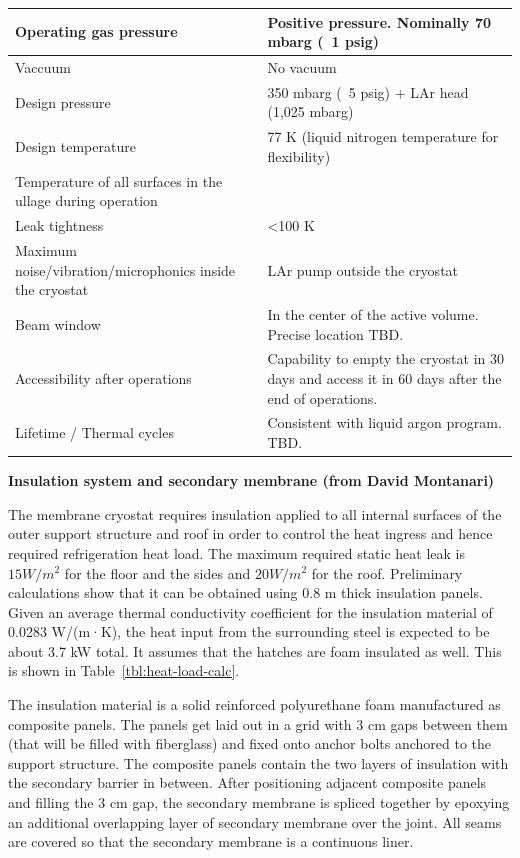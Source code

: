 \begin{table}[htpb]
\begin{tabular}{|p{}|p{}|}
Operating gas pressure   &  Positive pressure. Nominally 70 mbarg (~1 psig) \\ \hline
 Vaccuum  &  No vacuum \\ \hline
 Design pressure  &  350 mbarg (~5 psig) + LAr head (1,025 mbarg) \\ \hline
Design temperature   &  77 K (liquid nitrogen temperature for flexibility) \\ \hline
Temperature of all surfaces in the ullage during operation   &   \\ \hline
Leak tightness   & \textless 100 K  \\ \hline
Maximum noise/vibration/microphonics inside the cryostat   & LAr pump outside the cryostat  \\ \hline
Beam window   & In the center of the active volume. 
Precise location TBD.   \\ \hline
 Accessibility after operations  & Capability to empty the cryostat in 30 days and access it in 60 days after the end of operations. \\ \hline
  Lifetime / Thermal cycles &  Consistent with liquid argon program. TBD. \\ \hline
 \end{tabular}
\end{table}

\textbf{Insulation system and secondary membrane (from David Montanari)}

The membrane cryostat requires insulation applied to all internal surfaces of the outer support structure 
and roof in order to control the heat ingress and hence required refrigeration heat load. The maximum 
required static heat leak is $15 W/m^2$ for the floor and the sides and $20 W/m^2$ for the roof. 
Preliminary calculations show that it can be obtained using 0.8 m thick insulation panels. Given an 
average thermal conductivity coefficient for the insulation material of 0.0283 W/(m·K), the heat input 
from the surrounding steel is expected to be about 3.7 kW total. It assumes that the hatches are foam 
insulated as well. This is shown in Table~\ref{tbl:heat-load-calc}.

The insulation material is a solid reinforced polyurethane foam manufactured as composite panels. The 
panels get laid out in a grid with 3 cm gaps between them (that will be filled with fiberglass) and fixed 
onto anchor bolts anchored to the support structure. The composite panels contain the two layers of 
insulation with the secondary barrier in between. After positioning adjacent composite panels and filling 
the 3 cm gap, the secondary membrane is spliced together by epoxying an additional overlapping layer 
of secondary membrane over the joint. All seams are covered so that the secondary membrane is a 
continuous liner.

